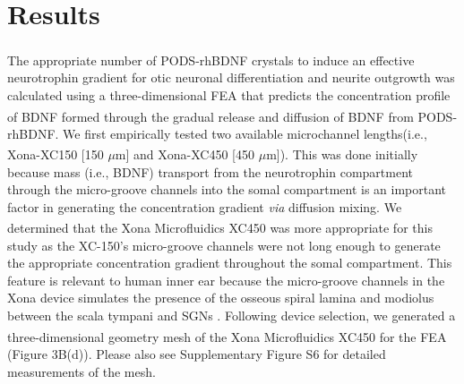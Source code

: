 \documentclass[review]{elsarticle}
\begin{document}
\section{Results}
The appropriate number of PODS\textsuperscript{\textregistered}-rhBDNF crystals to induce an effective neurotrophin gradient for otic neuronal differentiation and neurite outgrowth was calculated using a three-dimensional FEA that predicts the concentration profile of BDNF formed through the gradual release and diffusion of BDNF from PODS\textsuperscript{\textregistered}-rhBDNF. We first empirically tested two available microchannel lengths\textemdash (i.e., Xona\textsuperscript{\texttrademark}-XC150 [150 $\mu$m] and Xona\textsuperscript{\texttrademark}-XC450 [450 $\mu$m]). This was done initially because mass (i.e., BDNF) transport from the neurotrophin compartment through the micro-groove channels into the somal compartment is an important factor in generating the concentration gradient \textit{via} diffusion mixing.  We determined that the Xona\textsuperscript{\texttrademark} Microfluidics XC450 was more appropriate for this study as the XC-150's micro-groove channels were not long enough to generate the appropriate concentration gradient throughout the somal compartment. This feature is relevant to human inner ear because the micro-groove channels in the Xona device simulates the presence of the osseous spiral lamina and modiolus between the scala tympani and SGNs  \cite{Tuncel2005,Kucuk1991a}. Following device selection, we generated a three-dimensional geometry mesh of the Xona\textsuperscript{\texttrademark} Microfluidics XC450 for the FEA (Figure 3B(d)). Please also see Supplementary Figure S6 for detailed measurements of the mesh. 
\end{document}
